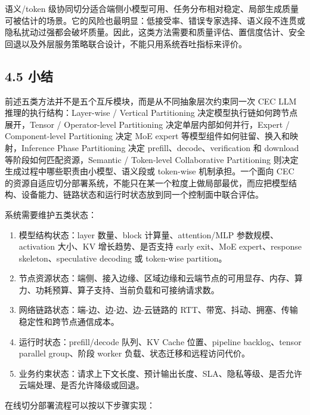 \documentclass[a4paper,10pt]{ctexart}
\begin{document}
语义/token 级协同切分适合端侧小模型可用、任务分布相对稳定、局部生成质量可被估计的场景。它的风险也最明显：低接受率、错误专家选择、语义段不连贯或隐私扰动过强都会破坏质量。因此，这类方法需要和质量评估、置信度估计、安全回退以及外层服务策略联合设计，不能只用系统吞吐指标来评价。


\subsection*{4.5 小结}

前述五类方法并不是五个互斥模块，而是从不同抽象层次约束同一次 CEC LLM 推理的执行结构：Layer-wise / Vertical Partitioning 决定模型执行链如何跨节点展开，Tensor / Operator-level Partitioning 决定单层内部如何并行，Expert / Component-level Partitioning 决定 MoE expert 等模型组件如何驻留、换入和映射，Inference Phase Partitioning 决定 prefill、decode、verification 和 download 等阶段如何匹配资源，Semantic / Token-level Collaborative Partitioning 则决定生成过程中哪些职责由小模型、语义段或 token-wise 机制承担。一个面向 CEC 的资源自适应切分部署系统，不能只在某一个粒度上做局部最优，而应把模型结构、设备能力、链路状态和运行时状态放到同一个控制面中联合评估。


系统需要维护五类状态：


\begin{enumerate}
\item 模型结构状态：layer 数量、block 计算量、attention/MLP 参数规模、activation 大小、KV 增长趋势、是否支持 early exit、MoE expert、response skeleton、speculative decoding 或 token-wise partition。

\item 节点资源状态：端侧、接入边缘、区域边缘和云端节点的可用显存、内存、算力、功耗预算、算子支持、当前负载和可接纳请求数。

\item 网络链路状态：端-边、边-边、边-云链路的 RTT、带宽、抖动、拥塞、传输稳定性和跨节点通信成本。

\item 运行时状态：prefill/decode 队列、KV Cache 位置、pipeline backlog、tensor parallel group、阶段 worker 负载、状态迁移和远程访问代价。

\item 业务约束状态：请求上下文长度、预计输出长度、SLA、隐私等级、是否允许云端处理、是否允许降级或回退。

\end{enumerate}
在线切分部署流程可以按以下步骤实现：
\end{document}
